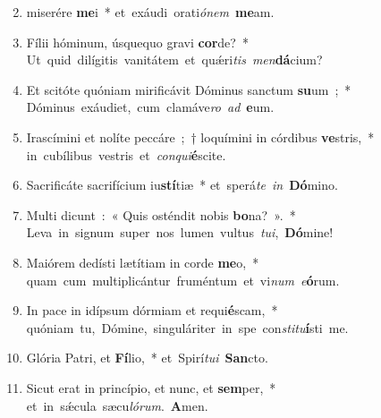 \begin{flushleft}
\begin{enumerate}[leftmargin=*]
\setcounter{enumi}{1}
\item miserére \textbf{me}i~* \mbox{et exáudi orati{\it ó}{\it nem} \textbf{me}am.}
\item Fílii hóminum, úsquequo gravi \textbf{cor}de?~* \mbox{Ut quid dilígitis vanitátem et qu\'{\ae}ri{\it tis} {\it men}\textbf{dá}cium?}
\item Et scitóte quóniam mirificávit Dóminus sanctum \textbf{su}um~;~* \mbox{Dóminus exáudiet, cum clamáve{\it ro} {\it ad} \textbf{e}um.}
\item Irascímini et nolíte peccáre~;~† loquímini in córdibus \textbf{ve}stris,~* \mbox{in cubílibus vestris et {\it con}{\it qui}\textbf{é}scite.}
\item Sacrificáte sacrifícium iu\textbf{stí}tiæ~* \mbox{et sperá{\it te} {\it in} \textbf{Dó}mino.}
\item Multi dicunt~:~« Quis osténdit nobis \textbf{bo}na?~».~* \mbox{Leva in signum super nos lumen vultus {\it tu}{\it i}, \textbf{Dó}mine!}
\item Maiórem dedísti lætítiam in corde \textbf{me}o,~* \mbox{quam cum multiplicántur fruméntum et vi{\it num} {\it e}\textbf{ó}rum.}
\item In pace in idípsum dórmiam et requi\textbf{é}scam,~* \mbox{quóniam tu, Dómine, singuláriter in spe con{\it sti}{\it tu}\textbf{í}sti me.}
\item Glória Patri, et \textbf{Fí}lio,~* \mbox{et Spirí{\it tu}{\it i} \textbf{San}cto.}
\item Sicut erat in princípio, et nunc, et \textbf{sem}per,~* \mbox{et in s\'{\ae}cula sæcu{\it ló}{\it rum}. \textbf{A}men.}
\end{enumerate}
\end{flushleft}

